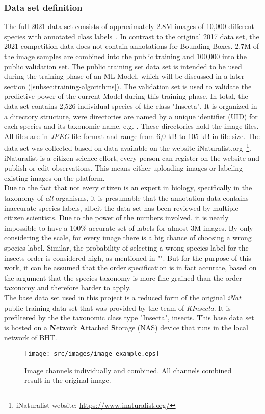 \subsubsection{Data set definition}
The full 2021 data set consists of approximately 2.8M images of 10,000 different species with annotated class labels~\cite{iNat-2021}.
In contrast to the original 2017 data set, the 2021 competition data does not contain annotations for Bounding Boxes.
2.7M of the image samples are combined into the public training and 100,000 into the public validation set.
The public training set data set is intended to be used during the training phase of an ML Model, which will be discussed in a later section (\ref{subsec:training-algorithms}).
The validation set is used to validate the predictive power of the current Model during this training phase.
In total, the data set contains 2,526 individual species of the class "Insecta".
It is organized in a directory structure, were directories are named by a unique identifier (UID) for each species and its taxonomic name, e.g. .
These directories hold the image files.
All files are in \textit{JPEG} file format and range from 6,0 kB to 105 kB in file size.
The data set was collected based on data available on the website iNaturalist.org~\footnote{iNaturalist website: \url{https://www.inaturalist.org/}}.
iNaturalist is a citizen science effort, every person can register on the website and publish or edit observations.
This means either uploading images or labeling existing images on the platform.\\
Due to the fact that not every citizen is an expert in biology, specifically in the taxonomy of \textit{all} organisms, it is presumable that the annotation data contains inaccurate species labels, albeit the data set has been reviewed by multiple citizen scientists.
Due to the power of the numbers involved, it is nearly impossible to have a 100\% accurate set of labels for almost 3M images.
By only considering the scale, for every image there is a big chance of choosing a wrong species label.
Similar, the probability of selecting a wrong species label for the insects order is considered high, as mentioned in "".
But for the purpose of this work, it can be assumed that the order specification is in fact accurate, based on the argument that the species taxonomy is more fine grained than the order taxonomy and therefore harder to apply.\\
The base data set used in this project is a reduced form of the original \textit{iNat} public training data set that was provided by the team of \textit{KInsecta}.
It is prefiltered by the the taxonomic class type "Insecta", insects.
This base data set is hosted on a \textbf{N}etwork \textbf{A}ttached \textbf{S}torage (NAS) device that runs in the local network of BHT.
\begin{figure}[!ht]
    \centering
    \texttt{[image: src/images/image-example.eps]}
    \caption{Image channels individually and combined. All channels combined result in the original image.}
    \label{fig:image-example}
\end{figure}

